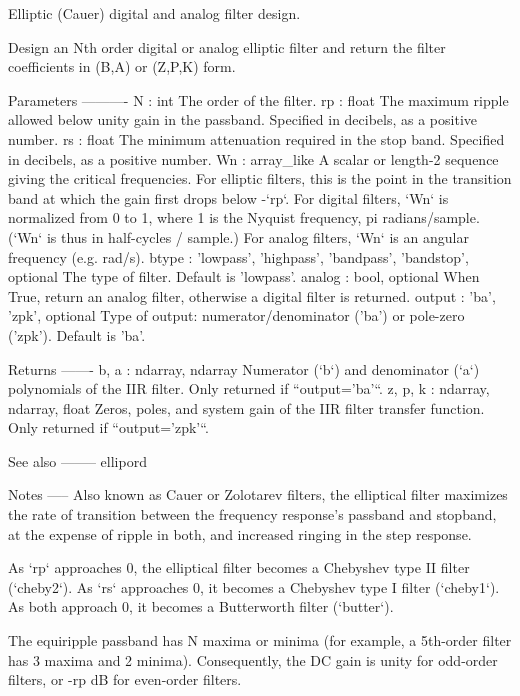 \begin{DoxyVerb}Elliptic (Cauer) digital and analog filter design.

Design an Nth order digital or analog elliptic filter and return
the filter coefficients in (B,A) or (Z,P,K) form.

Parameters
----------
N : int
    The order of the filter.
rp : float
    The maximum ripple allowed below unity gain in the passband.
    Specified in decibels, as a positive number.
rs : float
    The minimum attenuation required in the stop band.
    Specified in decibels, as a positive number.
Wn : array_like
    A scalar or length-2 sequence giving the critical frequencies.
    For elliptic filters, this is the point in the transition band at
    which the gain first drops below -`rp`.
    For digital filters, `Wn` is normalized from 0 to 1, where 1 is the
    Nyquist frequency, pi radians/sample.  (`Wn` is thus in
    half-cycles / sample.)
    For analog filters, `Wn` is an angular frequency (e.g. rad/s).
btype : {'lowpass', 'highpass', 'bandpass', 'bandstop'}, optional
    The type of filter.  Default is 'lowpass'.
analog : bool, optional
    When True, return an analog filter, otherwise a digital filter is
    returned.
output : {'ba', 'zpk'}, optional
    Type of output:  numerator/denominator ('ba') or pole-zero ('zpk').
    Default is 'ba'.

Returns
-------
b, a : ndarray, ndarray
    Numerator (`b`) and denominator (`a`) polynomials of the IIR filter.
    Only returned if ``output='ba'``.
z, p, k : ndarray, ndarray, float
    Zeros, poles, and system gain of the IIR filter transfer
    function.  Only returned if ``output='zpk'``.

See also
--------
ellipord

Notes
-----
Also known as Cauer or Zolotarev filters, the elliptical filter maximizes
the rate of transition between the frequency response's passband and
stopband, at the expense of ripple in both, and increased ringing in the
step response.

As `rp` approaches 0, the elliptical filter becomes a Chebyshev
type II filter (`cheby2`).  As `rs` approaches 0, it becomes a Chebyshev
type I filter (`cheby1`).  As both approach 0, it becomes a Butterworth
filter (`butter`).

The equiripple passband has N maxima or minima (for example, a
5th-order filter has 3 maxima and 2 minima).  Consequently, the DC gain is
unity for odd-order filters, or -rp dB for even-order filters.


\end{DoxyVerb}
